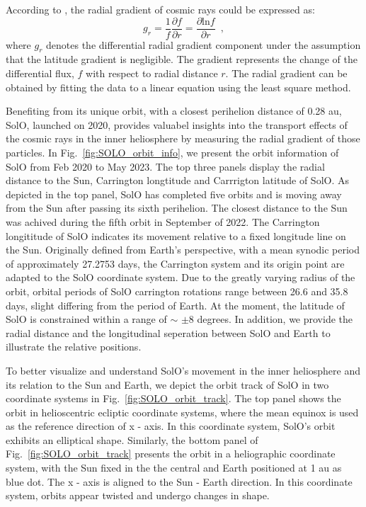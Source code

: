 According to \citet{Rankin2021ApJ}, the radial gradient of cosmic rays could be expressed as:
\begin{equation}
    g_r = \frac{1}{f}\frac{\partial{f}}{\partial{r}} = \frac{\partial{\mathrm{ln} f}}{\partial{r}} \enspace ,
    \label{eq:radial_gradient}
\end{equation}
where $g_r$ denotes the differential radial gradient component under the assumption that the latitude gradient is negligible. The gradient represents the change of the differential flux, $f$ with respect to radial distance $r$. The radial gradient can be obtained by fitting the data to a linear equation using the least square method.


Benefiting from its unique orbit, with a closest perihelion distance of 0.28 au, \ac{SolO}, launched on 2020, provides valuabel insights into the transport effects of the cosmic rays in the inner heliosphere by measuring the radial gradient of those particles.
In Fig.~\ref{fig:SOLO_orbit_info}, we present the orbit information of \ac{SolO} from Feb 2020 to May 2023. The top three panels display the radial distance to the Sun, Carrington longtitude and Carrrigton latitude of \ac{SolO}. As depicted in the top panel, \ac{SolO} has completed five orbits and is moving away from the Sun after passing its sixth perihelion. The closest distance to the Sun was achived during the fifth orbit in September of 2022. 
The Carrington longititude of \ac{SolO} indicates its movement relative to a fixed longitude line on the Sun. Originally defined from Earth's perspective, with a mean synodic period of approximately 27.2753 days, the Carrington system and its origin point are adapted to the \ac{SolO} coordinate system. 
Due to the greatly varying radius of the orbit, orbital periods of \ac{SolO} carrington rotations range between 26.6 and 35.8 days, slight differing from the period of Earth. At the moment, the latitude of \ac{SolO} is constrained within a range of $\sim$ $\pm$8 degrees.
In addition, we provide the radial distance and the longitudinal seperation between \ac{SolO} and Earth to illustrate the relative positions.

To better visualize and understand \ac{SolO}'s movement in the inner heliosphere and its relation to the Sun and Earth, we depict the orbit track of \ac{SolO} in two coordinate systems in Fig.~\ref{fig:SOLO_orbit_track}. The top panel shows the orbit in helioscentric ecliptic coordinate systems, where the mean equinox is used as the reference direction of x - axis. In this coordinate system, \ac{SolO}'s orbit exhibits an elliptical shape. Similarly, the bottom panel of Fig.~\ref{fig:SOLO_orbit_track} presents the orbit in a heliographic coordinate system, with the Sun fixed in the the central and Earth positioned at 1 au as blue dot. The x - axis is aligned to the Sun - Earth direction. In this coordinate system, orbits appear twisted and undergo changes in shape.

